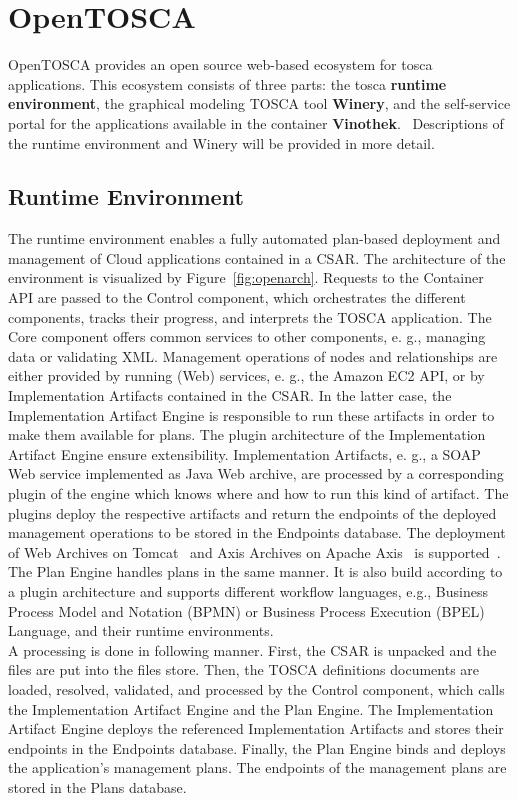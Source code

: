 \section{OpenTOSCA} \label{sec:opentosca}
OpenTOSCA provides an open source web-based ecosystem for \gls{tosca} applications. 
This ecosystem consists of three parts: the \gls{tosca} \textbf{runtime environment}, the graphical modeling TOSCA tool \textbf{Winery}, and the self-service portal for the applications available in the container \textbf{Vinothek}.~\cite*{OpenTOSCA}
Descriptions of the runtime environment and Winery will be provided in more detail. 
\subsection*{Runtime Environment}
The runtime environment enables a fully automated plan-based deployment and management of Cloud applications contained in a CSAR. 
The architecture of the environment is visualized by Figure~\ref{fig:openarch}.
Requests to the Container API are passed to the Control component, which orchestrates the different components, tracks their progress, and interprets the TOSCA application. 
The Core component offers common services to other components, e. g., managing data or validating XML.
Management operations of nodes and relationships are either provided by running (Web) services, e. g., the Amazon EC2 API, or by Implementation Artifacts contained in the CSAR.
In the latter case, the Implementation Artifact Engine is responsible to run these artifacts in order to make them available for plans. 
The plugin architecture of the Implementation Artifact Engine ensure extensibility.
Implementation Artifacts, e. g., a SOAP Web service implemented as Java Web archive, are processed by a corresponding plugin of the engine which knows where and how to run this kind of artifact. 
The plugins deploy the respective artifacts and return the endpoints of the deployed management operations to be stored in the Endpoints database.
The deployment of Web Archives on Tomcat~\cite*{tomcat} and Axis Archives on Apache Axis~\cite*{axis} is supported~\cite*{macharb}.
The Plan Engine handles plans in the same manner.
It is also build according to a plugin architecture and supports different workflow languages, e.g., Business Process Model and Notation (BPMN) or Business Process Execution (BPEL) Language, and their runtime environments.~\cite{INPROC-2013-45}
\\
A processing is done in following manner.  
First, the CSAR is unpacked and the files are put into the files store.
Then, the TOSCA definitions documents are loaded, resolved, validated, and processed by the Control component, which calls the Implementation Artifact Engine and the Plan Engine.
The Implementation Artifact Engine deploys the referenced Implementation Artifacts and stores their endpoints in the Endpoints database. 
Finally, the Plan Engine binds and deploys the application’s management plans.
The endpoints of the management plans are stored in the Plans database.~\cite{INPROC-2013-45}
%

